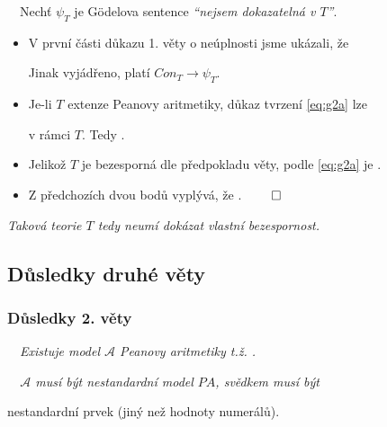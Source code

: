     \smallskip
    
    \ \ Nechť $\psi_T$ je Gödelova sentence {\it ``nejsem dokazatelná v $T$''}.
    \begin{itemize}
    \item V první části důkazu 1. věty o neúplnosti jsme ukázali, že

    

    Jinak vyjádřeno, platí $Con_T\to \psi_T$.

    
    \item Je-li $T$ extenze Peanovy aritmetiky, důkaz tvrzení \eqref{eq:g2a} lze 

    
    v rámci $T$. Tedy .

    
    \item Jelikož $T$ je bezesporná dle předpokladu věty, podle \eqref{eq:g2a} je
    .

    
    \item Z předchozích dvou bodů vyplývá, že . $\qed$
    \end{itemize}
    \smallskip
    
    {\it {} Taková teorie $T$ tedy neumí dokázat vlastní bezespornost.}
    
    


\subsection{Důsledky druhé věty}\todo

\subsubsection*{Důsledky 2. věty}
    \ \ {\it Existuje model $\mathcal{A}$ Peanovy aritmetiky t.ž. .}
    \medskip
    
    {\it {}\ \ $\mathcal{A}$ musí být nestandardní model $PA$, svědkem musí být
    \smallskip
    
    nestandardní prvek (jiný než hodnoty numerálů).}
    \bigskip
    
